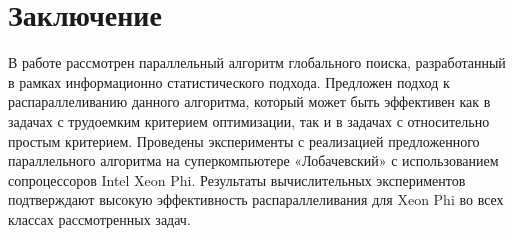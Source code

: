 \section{Заключение}
В работе рассмотрен параллельный алгоритм глобального поиска, разработанный в рамках информационно статистического подхода. Предложен подход к распараллеливанию данного алгоритма, который может быть эффективен как в задачах с трудоемким критерием оптимизации, так и в задачах с относительно простым критерием. Проведены эксперименты с реализацией предложенного параллельного алгоритма на суперкомпьютере «Лобачевский» с использованием сопроцессоров Intel Xeon Phi. Результаты вычислительных экспериментов подтверждают высокую эффективность распараллеливания для Xeon Phi во всех классах рассмотренных задач.